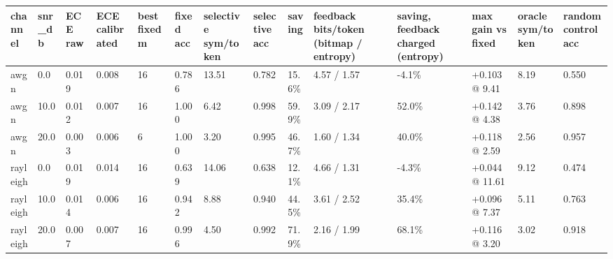 \begin{tabular}{llllllllllllll}
\hline
channel & snr\_db & ECE raw & ECE calibrated & best fixed m & fixed acc & selective sym/token & selective acc & saving & feedback bits/token (bitmap / entropy) & saving, feedback charged (entropy) & max gain vs fixed & oracle sym/token & random control acc \\
\hline
awgn & 0.0 & 0.019 & 0.008 & 16 & 0.786 & 13.51 & 0.782 & 15.6\% & 4.57 / 1.57 & -4.1\% & +0.103 @ 9.41 & 8.19 & 0.550 \\
awgn & 10.0 & 0.012 & 0.007 & 16 & 1.000 & 6.42 & 0.998 & 59.9\% & 3.09 / 2.17 & 52.0\% & +0.142 @ 4.38 & 3.76 & 0.898 \\
awgn & 20.0 & 0.003 & 0.006 & 6 & 1.000 & 3.20 & 0.995 & 46.7\% & 1.60 / 1.34 & 40.0\% & +0.118 @ 2.59 & 2.56 & 0.957 \\
rayleigh & 0.0 & 0.019 & 0.014 & 16 & 0.639 & 14.06 & 0.638 & 12.1\% & 4.66 / 1.31 & -4.3\% & +0.044 @ 11.61 & 9.12 & 0.474 \\
rayleigh & 10.0 & 0.014 & 0.006 & 16 & 0.942 & 8.88 & 0.940 & 44.5\% & 3.61 / 2.52 & 35.4\% & +0.096 @ 7.37 & 5.11 & 0.763 \\
rayleigh & 20.0 & 0.007 & 0.007 & 16 & 0.996 & 4.50 & 0.992 & 71.9\% & 2.16 / 1.99 & 68.1\% & +0.116 @ 3.20 & 3.02 & 0.918 \\
\hline
\end{tabular}
